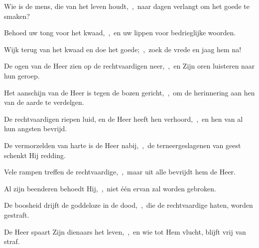 \documentclass[12pt,twoside,a5paper]{article}
\begin{document}
\begin{halfparskip}
  Wie is de mens, die van het leven houdt,~\sep\ naar dagen verlangt om het goede te smaken?

  Behoed uw tong voor het kwaad,~\sep\ en uw lippen voor bedrieglijke woorden.

  Wijk terug van het kwaad en doe het goede;~\sep\ zoek de vrede en jaag hem na!

  De ogen van de Heer zien op de rechtvaardigen neer,~\sep\ en Zijn oren luisteren naar hun geroep.

  Het aanschijn van de Heer is tegen de bozen gericht,~\sep\ om de herinnering aan hen van de aarde te verdelgen.

  De rechtvaardigen riepen luid, en de Heer heeft hen verhoord,~\sep\ en hen van al hun angsten bevrijd.

  De vermorzelden van harte is de Heer nabij,~\sep\ de terneergeslagenen van geest schenkt Hij redding.

  Vele rampen treffen de rechtvaardige,~\sep\ maar uit alle bevrijdt hem de Heer.

  Al zijn beenderen behoedt Hij,~\sep\ niet één ervan zal worden gebroken.

  De boosheid drijft de goddeloze in de dood,~\sep\ die de rechtvaardige haten, worden gestraft.

  De Heer spaart Zijn dienaars het leven,~\sep\ en wie tot Hem vlucht, blijft vrij van straf.
\end{halfparskip}

\end{document}
